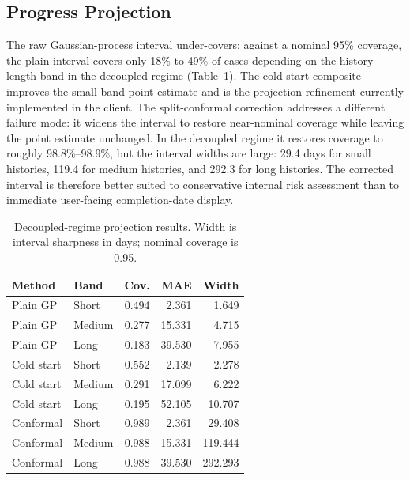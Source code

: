 \documentclass[conference]{IEEEtran}
\begin{document}
\subsection{Progress Projection}
\label{sec:res-proj}
The raw Gaussian-process interval under-covers: against a nominal 95\% coverage, the plain interval covers only 18\% to 49\% of cases depending on the history-length band in the decoupled regime (Table~\ref{tab:res-proj}). The cold-start composite improves the small-band point estimate and is the projection refinement currently implemented in the client. The split-conformal correction addresses a different failure mode: it widens the interval to restore near-nominal coverage while leaving the point estimate unchanged. In the decoupled regime it restores coverage to roughly 98.8\%--98.9\%, but the interval widths are large: 29.4 days for small histories, 119.4 for medium histories, and 292.3 for long histories. The corrected interval is therefore better suited to conservative internal risk assessment than to immediate user-facing completion-date display.

\begin{table}[!t]
\centering
\caption{Decoupled-regime projection results. Width is interval sharpness in days; nominal coverage is 0.95.}
\label{tab:res-proj}
\scriptsize
\begin{tabular}{@{}l l r r r@{}}
\toprule
\textbf{Method} & \textbf{Band} & \textbf{Cov.} & \textbf{MAE} & \textbf{Width} \\
\midrule
Plain GP & Short & 0.494 & 2.361 & 1.649 \\
Plain GP & Medium & 0.277 & 15.331 & 4.715 \\
Plain GP & Long & 0.183 & 39.530 & 7.955 \\
Cold start & Short & 0.552 & 2.139 & 2.278 \\
Cold start & Medium & 0.291 & 17.099 & 6.222 \\
Cold start & Long & 0.195 & 52.105 & 10.707 \\
Conformal & Short & 0.989 & 2.361 & 29.408 \\
Conformal & Medium & 0.988 & 15.331 & 119.444 \\
Conformal & Long & 0.988 & 39.530 & 292.293 \\
\bottomrule
\end{tabular}
\end{table}
\end{document}
